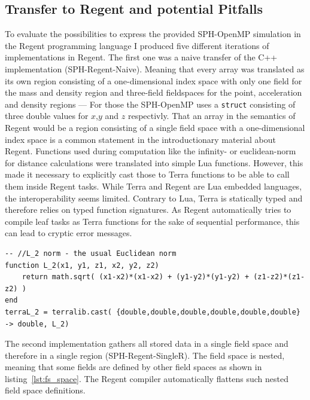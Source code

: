 \documentclass{article}      %
\begin{document}
\subsection{Transfer to Regent and potential Pitfalls}
To evaluate the possibilities to express the provided SPH-OpenMP simulation in the Regent programming language I produced five different iterations of implementations in Regent. The first one was a naive transfer of the C++ implementation (SPH-Regent-Naive). Meaning that every array was translated as its own region consisting of a one-dimensional index space with only one field for the mass and density region and three-field fieldspaces for the point, acceleration and density regions --- For those the SPH-OpenMP uses a \lstinline{struct} consisting of three double values for $x$,$y$ and $z$ respectivly. That an array in the semantics of Regent would be a region consisting of a single field space with a one-dimensional index space is a common statement in the introductionary material about Regent. Functions used during computation like the infinity- or euclidean-norm for distance calculations were translated into simple Lua functions. However, this made it necessary to explicitly cast those to Terra functions to be able to call them inside Regent tasks. While Terra and Regent are Lua embedded languages, the interoperability seems limited. Contrary to Lua, Terra is statically typed and therefore relies on typed function signatures. As Regent automatically tries to compile leaf tasks as Terra functions for the sake of sequential performance, this can lead to cryptic error messages.
\lstset{
	captionpos=b,
	style=regent,
	basicstyle=\scriptsize,
	numbers=left,
	numberstyle=\tiny,
	columns=fullflexible,
	firstnumber=71,
	stepnumber=1,
}
\begin{lstlisting}[frame=single,label={lst:terra_cast},
	caption={Implementation of the euclidean norm in SPH-Regent-Naive.}]
-- //L_2 norm - the usual Euclidean norm
function L_2(x1, y1, z1, x2, y2, z2)
	return math.sqrt( (x1-x2)*(x1-x2) + (y1-y2)*(y1-y2) + (z1-z2)*(z1-z2) )
end
terraL_2 = terralib.cast( {double,double,double,double,double,double} -> double, L_2)
\end{lstlisting}

The second implementation gathers all stored data in a single field space and therefore in a single region (SPH-Regent-SingleR). The field space is nested, meaning that some fields are defined by other field spaces as shown in listing~\ref{lst:fs_space}. The Regent compiler automatically flattens such nested field space definitions.
\end{document}
